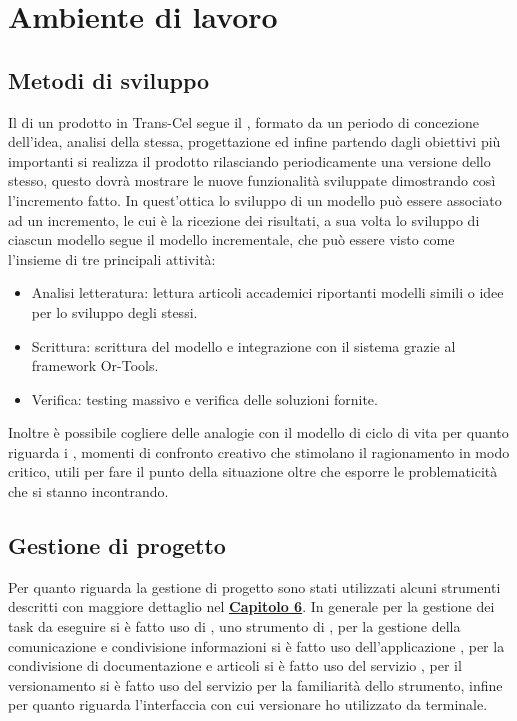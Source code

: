 \section{Ambiente di lavoro}
\subsection{Metodi di sviluppo}
Il  di un prodotto in Trans-Cel segue il , formato da un periodo di concezione dell'idea, analisi della stessa, progettazione ed infine partendo dagli obiettivi più importanti si realizza il prodotto rilasciando periodicamente una versione dello stesso, questo dovrà mostrare le nuove funzionalità sviluppate dimostrando così l'incremento fatto. In quest'ottica lo sviluppo di un modello può essere associato ad un incremento, le cui  è la ricezione dei risultati, a sua volta lo sviluppo di ciascun modello segue il modello incrementale, che può essere visto come l'insieme di tre principali attività:
\begin{itemize}
	\item Analisi letteratura: lettura articoli accademici riportanti modelli simili o idee per lo sviluppo degli stessi.
	\item Scrittura: scrittura del modello e integrazione con il sistema grazie al framework Or-Tools.
	\item Verifica: testing massivo e verifica delle soluzioni fornite.
\end{itemize}
Inoltre è possibile cogliere delle analogie con il modello di ciclo di vita  per quanto riguarda i , momenti di confronto creativo che stimolano il ragionamento in modo critico, utili per fare il punto della situazione oltre che esporre le problematicità che si stanno incontrando.

\subsection{Gestione di progetto}
Per quanto riguarda la gestione di progetto sono stati utilizzati alcuni strumenti descritti con maggiore dettaglio nel \hyperlink{(chap:capitolo6)}{\textbf{Capitolo 6}}. In generale per la gestione dei task da eseguire si è fatto uso di , uno strumento di , per la gestione della comunicazione e condivisione informazioni si è fatto uso dell'applicazione , per la condivisione di documentazione e articoli si è fatto uso del servizio , per il versionamento si è fatto uso del servizio  per la familiarità dello strumento, infine per quanto riguarda l'interfaccia con cui versionare ho utilizzato  da terminale.
	
